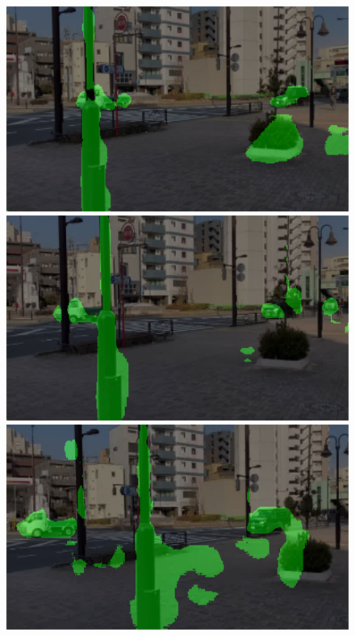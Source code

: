 \documentclass[10pt, twocolumn]{article}
\begin{document}
\begin{figure}[ht]
  \centering
  \begin{minipage}{0.3\linewidth}
    \includegraphics[width=\linewidth]{fig/contextual/frame_00000002.png}
    \includegraphics[width=\linewidth]{fig/contextual/frame_00000010.png}
    \includegraphics[width=\linewidth]{fig/contextual/frame_00000020.png}

\end{minipage}
\end{figure}
\end{document}
